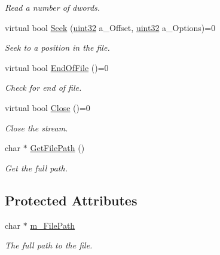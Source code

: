 \begin{DoxyCompactItemize}
\begin{DoxyCompactList}\small\item\em Read a number of dwords. \item\end{DoxyCompactList}\item 
virtual bool \hyperlink{classtil_1_1_file_stream_a29dfe625c988d68478ac6418478f7ea1}{Seek} (\hyperlink{namespacetil_a20db61688ed403d11f057a508d87e54c}{uint32} a\_\-Offset, \hyperlink{namespacetil_a20db61688ed403d11f057a508d87e54c}{uint32} a\_\-Options)=0
\begin{DoxyCompactList}\small\item\em Seek to a position in the file. \item\end{DoxyCompactList}\item 
virtual bool \hyperlink{classtil_1_1_file_stream_a693c2379367badd18d65d7f83512f595}{EndOfFile} ()=0
\begin{DoxyCompactList}\small\item\em Check for end of file. \item\end{DoxyCompactList}\item 
virtual bool \hyperlink{classtil_1_1_file_stream_a247dffc5fa0875cbafb48c63baa03493}{Close} ()=0
\begin{DoxyCompactList}\small\item\em Close the stream. \item\end{DoxyCompactList}\item 
char $\ast$ \hyperlink{classtil_1_1_file_stream_a11c2696a386b75cbcb3194a944debc78}{GetFilePath} ()
\begin{DoxyCompactList}\small\item\em Get the full path. \item\end{DoxyCompactList}\end{DoxyCompactItemize}
\subsection*{Protected Attributes}
\begin{DoxyCompactItemize}
\item 
\hypertarget{classtil_1_1_file_stream_ae96d56b6be09292181e4a6924e3fa2f1}{
char $\ast$ \hyperlink{classtil_1_1_file_stream_ae96d56b6be09292181e4a6924e3fa2f1}{m\_\-FilePath}}
\label{classtil_1_1_file_stream_ae96d56b6be09292181e4a6924e3fa2f1}

\begin{DoxyCompactList}\small\item\em The full path to the file. \item\end{DoxyCompactList}\end{DoxyCompactItemize}


